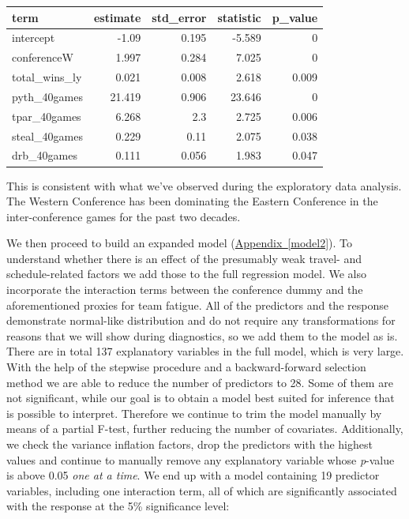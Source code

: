 \documentclass[
    12pt,
    a4paper,
    titlepage,  %
    abstract,  %
    headings=standardclasses,  %
    bibliography=totocnumbered  %
]{scrartcl}
\begin{document}
\begingroup
    \ttfamily
    \begin{longtable}{|l|r|r|r|r|}
        \hline
        \textbf{term} & \textbf{estimate} & \textbf{std\_error} & \textbf{statistic} & \textbf{p\_value} \\ \hline
        \endhead
        intercept & -1.09 & 0.195 & -5.589 & 0 \\ \hline
        conferenceW & 1.997 & 0.284 & 7.025 & 0 \\ \hline
        total\_wins\_ly & 0.021 & 0.008 & 2.618 & 0.009 \\ \hline
        pyth\_40games & 21.419 & 0.906 & 23.646 & 0 \\ \hline
        tpar\_40games & 6.268 & 2.3 & 2.725 & 0.006 \\ \hline
        steal\_40games & 0.229 & 0.11 & 2.075 & 0.038 \\ \hline
        drb\_40games & 0.111 & 0.056 & 1.983 & 0.047 \\ \hline
    \end{longtable}
\endgroup

This is consistent with what we've observed during the exploratory data analysis. The Western Conference has been dominating the Eastern Conference in the inter-conference games for the past two decades.

We then proceed to build an expanded model (\hyperref[model2]{Appendix~\ref*{model2}}). To understand whether there is an effect of the presumably weak travel- and schedule-related factors we add those to the full regression model. We also incorporate the interaction terms between the conference dummy and the aforementioned proxies for team fatigue. All of the predictors and the response demonstrate normal-like distribution and do not require any transformations for reasons that we will show during diagnostics, so we add them to the model as is. There are in total 137 explanatory variables in the full model, which is very large. With the help of the stepwise procedure and a backward-forward selection method we are able to reduce the number of predictors to 28. Some of them are not significant, while our goal is to obtain a model best suited for inference that is possible to interpret. Therefore we continue to trim the model manually by means of a partial F-test, further reducing the number of covariates. Additionally, we check the variance inflation factors, drop the predictors with the highest values and continue to manually remove any explanatory variable whose \emph{p}-value is above 0.05 \emph{one at a time}. We end up with a model containing 19 predictor variables, including one interaction term, all of which are significantly associated with the response at the 5\% significance level:
\end{document}
